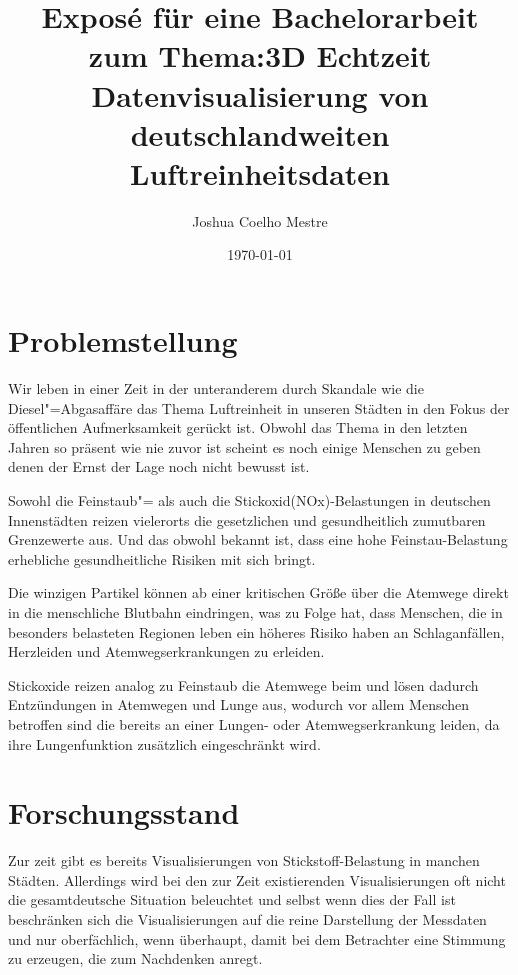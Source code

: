 \documentclass[12pt]{article} %
\title{Exposé für eine Bachelorarbeit zum Thema:\newline 3D Echtzeit Datenvisualisierung von deutschlandweiten Luftreinheitsdaten}
\author{Joshua Coelho Mestre}
\date{\today} %
\begin{document}
\maketitle
\newpage
\tableofcontents %
\newpage %

\section{Problemstellung} \label{sec:Problemstellung}

Wir leben in einer Zeit in der unteranderem durch Skandale wie die Diesel"=Abgasaffäre das Thema Luftreinheit in unseren Städten in den Fokus der öffentlichen Aufmerksamkeit gerückt ist.
Obwohl das Thema in den letzten Jahren so präsent wie nie zuvor ist scheint es noch einige Menschen zu geben denen der Ernst der Lage noch nicht bewusst ist.

Sowohl die Feinstaub"= als auch die Stickoxid(NOx)-Belastungen in deutschen Innenstädten reizen vielerorts die gesetzlichen und gesundheitlich zumutbaren Grenzewerte aus. Und das obwohl bekannt ist, dass eine hohe Feinstau-Belastung erhebliche gesundheitliche Risiken mit sich bringt.

Die winzigen Partikel können ab einer kritischen Größe über die Atemwege direkt in die menschliche Blutbahn eindringen, was zu Folge hat, dass Menschen, die in besonders belasteten Regionen leben ein höheres Risiko haben an Schlaganfällen, Herzleiden und Atemwegserkrankungen zu erleiden.

Stickoxide reizen analog zu Feinstaub die Atemwege beim und lösen dadurch Entzündungen in Atemwegen und Lunge aus, wodurch vor allem Menschen betroffen sind die bereits an einer Lungen- oder Atemwegserkrankung leiden, da ihre Lungenfunktion zusätzlich eingeschränkt wird.\cite{zo:StickoxideUndFeinstaub}

\section{Forschungsstand} \label{sec:Forschungsstand}

Zur zeit gibt es bereits Visualisierungen von Stickstoff-Belastung in manchen Städten. Allerdings wird bei den zur Zeit existierenden Visualisierungen oft nicht die gesamtdeutsche Situation beleuchtet und selbst wenn dies der Fall ist beschränken sich die Visualisierungen auf die reine Darstellung der Messdaten und nur oberfächlich, wenn überhaupt, damit bei dem Betrachter eine Stimmung zu erzeugen, die zum Nachdenken anregt.
\end{document}
